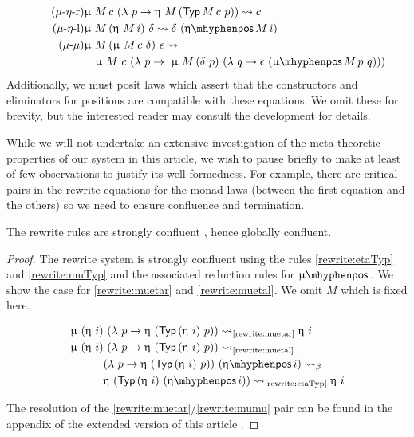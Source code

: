 \begin{align*}
  \tag{$\mu$-$\eta$-r}
  \label{rewrite:muetar}
  &\upmu\ M\, c\ (\lambda\ p \to \upeta\ M\, (\Typ M\, c\ p)) \leadsto c\\
  \tag{$\mu$-$\eta$-l}\label{rewrite:muetal}
  &\upmu\ M\, (\upeta\ M\, i)\ \delta \leadsto \delta\ (\etapos M\, i)\\
  \tag{$\mu$-$\mu$}\label{rewrite:mumu}
  &\upmu\ M\, (\upmu\ M\, c\ \delta)\ \epsilon \leadsto \\
  &\quad \upmu\ M\ c\ (\lambda\ p \to\ \upmu\ M\, (\delta\ p)\ (\lambda\ q \to \epsilon\ (\mupos M\, p\ q)))
\end{align*}
Additionally, we must posit laws which assert that the constructors
and eliminators for positions are compatible with these equations.  We
omit these for brevity, but the interested reader may consult the
development for details.

While we will not undertake an extensive investigation of the
meta-theoretic properties of our system in this article, we wish to
pause briefly to make at least of few observations to justify its
well-formedness.  For example, there are critical pairs in the rewrite
equations for the monad laws (between the first equation and the
others) so we need to ensure confluence and termination.
\begin{lem}
  The rewrite rules are strongly confluent \cite{huet80}, hence globally confluent.
\end{lem}
\begin{proof}
  The rewrite system is strongly confluent using the rules 
  \eqref{rewrite:etaTyp} and \eqref{rewrite:muTyp} and the associated reduction rules
  for $\mupos$.
  We show the case for \ref{rewrite:muetar} and \ref{rewrite:muetal}.
  We omit $M$ which is fixed here.

  \begin{align*}
  \upmu\ (\upeta\ i)&\ (\lambda\ p \to \upeta\ (\Typ (\upeta\ i)\ p)) \leadsto_{\text{\ref{rewrite:muetar}}} \upeta\ i\\
  \upmu\ (\upeta\ i)&\ (\lambda\ p \to \upeta\ (\Typ (\upeta\ i)\ p)) \leadsto_{\text{\ref{rewrite:muetal}}} \\
  &(\lambda\ p \to \upeta\ (\Typ (\upeta\ i)\ p))\ (\etapos i) \leadsto_\beta \\ 
  &\upeta\ (\Typ (\upeta\ i)\ (\etapos i)) \leadsto_{\text{\ref{rewrite:etaTyp}}} \upeta\ i
  \end{align*}

  The resolution of the \ref{rewrite:muetar}/\ref{rewrite:mumu} pair
  can be found in the appendix of the extended version of this article
  \cite[Lemma \ref{proof:muetarmumu-proof}]{allioux2021types}.
\end{proof}

